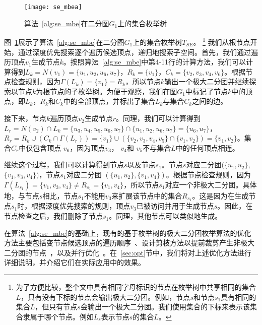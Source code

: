 \begin{figure} [ht]
  \vspace{0.1 in}
  \centering
  \texttt{[image: se\_mbea]}
  \vspace{0.1 in}
  \caption{算法~\ref{alg:se_mbe}在二分图$G_1$上的集合枚举树}
  \label{fig:se_mbea}
\end{figure}

\begin{example}
  \label{example:se}
  图~\ref{fig:se_mbea}展示了算法~\ref{alg:se_mbe}在二分图$G_1$上的集合枚举树$T_{SE}$。
  \footnote{为了方便比较，整个文中具有相同字母标识的节点在枚举树中共享相同的集合$L$，只有没有下标的节点会输出极大二分团。例如，节点$s$和节点$s_1$具有相同的集合$L$，但只有节点$s$会输出一个极大二分团。我们使用集合的下标来表示该集合隶属于哪个节点。例如$L_s$表示节点$s$的集合$L$。 
}
我们从根节点开始，通过深度优先搜索逐个遍历候选顶点，递归地搜索子空间。首先，我们通过遍历顶点$v_1$生成节点$k$。按照算法~\ref{alg:se_mbe}中第4-11行的计算方法，我们可以计算得到$L_k=N(v_1)=\{u_1, u_2, u_6, u_7\}$，$R_k=\{v_1\}$，$C_k=\{v_2,v_3,v_4,v_6\}$。根据节点检查规则，因为$\Gamma(L_{k}) = \{v_1\} = R_{k}$，所以节点$k$输出一个极大二分团并继续探索以节点$k$为根节点的子枚举树。为便于观察，我们在图$G_1$中标记了节点$k$中的顶点，即$L_k$，$R_k$和$C_k$中的全部顶点，并标出了集合$L_k$与集合$C_k$之间的边。

接下来，节点$k$遍历顶点$v_2$生成节点$r$。同理，我们可以计算得到$L_{r} = N(v_2) \cap L_{k} 
= \{u_3, u_4, u_5, u_6, u_7\} \cap \{u_1, u_2, u_6, u_7\} = \{u_6, u_7\}$， $R_{r} = R_{k} \cup (C_{k} \cap \Gamma(L_{r})) = \{v_1\} \cup (\{v_2, v_3, v_4, v_5\} \cap \{v_1, v_2\}) = \{v_1, v_2\}$。集合$C_{r}$中仅包含顶点 $v_6$，因为顶点$v_3$， $v_4$和 $v_5$不与集合$L$中的任何顶点相连。

继续这个过程，我们可以计算得到节点$s$以及节点$s_1$。节点$s$对应二分团$(\{u_1, u_2\},$ $\{v_1, v_3, v_4\})$，节点$s_1$对应二分团 $(\{u_1, u_2\}, \{v_1, v_4\})$。根据节点检查规则，因为$\Gamma(L_{s_1}) = \{v_1, v_3, v_4\} \neq R_{s_1} = \{v_1, v_4\}$，所以节点$s_1$对应一个非极大二分团。具体地，与节点$s$相比，节点$s_1$不能用$v_3$来扩展该节点中的集合$R_{s_1}$。这是因为在生成节点$s_1$时，根据深度优先搜索的规则，顶点$v_3$已被访问并用于生成节点$s$。因此，在节点检查之后，我们删除了节点$s_1$。同理，其他节点可以类似地生成。

\end{example}

在算法~\ref{alg:se_mbe}的基础上，现有的基于枚举树的极大二分团枚举算法的优化方法主要包括变节点候选顶点的遍历顺序~\cite{minel06,iMBEA14,PMBE20,ooMBE22}、设计剪枝方法以提前裁剪产生非极大二分团的节点~\cite{iMBEA14,PMBE20,ooMBE22}，以及并行优化~\cite{mapreduceMBE16,parMBE18}。在~\ref{sec:opt}节中，我们将对上述优化方法进行详细说明，并介绍它们在实际应用中的效果。

